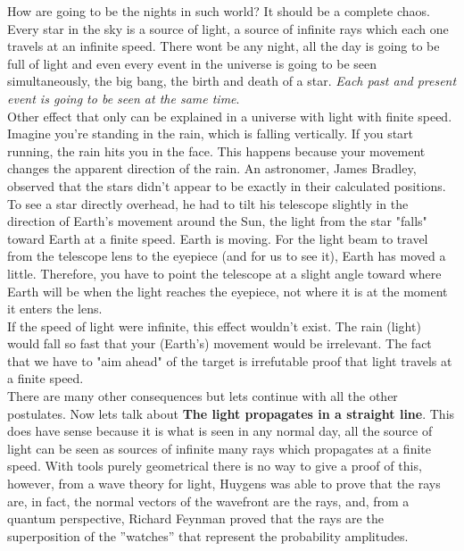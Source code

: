         How are going to be the nights in such world? It should be a complete chaos. Every star in the sky is a source of light, a source of infinite rays which each one travels at an infinite speed. There wont be any night, all the day is going to be full of light and even every event in the universe is going to be seen simultaneously, the big bang, the birth and death of a star. \textit{Each past and present event is going to be seen at the same time}.\\

        Other effect that only can be explained in a universe with light with finite speed. Imagine you're standing in the rain, which is falling vertically. If you start running, the rain hits you in the face. This happens because your movement changes the apparent direction of the rain. An astronomer, James Bradley, observed that the stars didn't appear to be exactly in their calculated positions. To see a star directly overhead, he had to tilt his telescope slightly in the direction of Earth's movement around the Sun, the light from the star "falls" toward Earth at a finite speed. Earth is moving. For the light beam to travel from the telescope lens to the eyepiece (and for us to see it), Earth has moved a little. Therefore, you have to point the telescope at a slight angle toward where Earth will be when the light reaches the eyepiece, not where it is at the moment it enters the lens.\\

        If the speed of light were infinite, this effect wouldn't exist. The rain (light) would fall so fast that your (Earth's) movement would be irrelevant. The fact that we have to "aim ahead" of the target is irrefutable proof that light travels at a finite speed. \\

        There are many other consequences but lets continue with all the other postulates. Now lets talk about \textbf{The light propagates in a straight line}. This does have sense because it is what is seen in any normal day, all the source of light can be seen as sources of infinite many rays which propagates at a finite speed. With tools purely geometrical there is no way to give a proof of this, however, from a wave theory for light, Huygens was able to prove that the rays are, in fact, the normal vectors of the wavefront are the rays, and, from a quantum perspective, Richard Feynman proved that the rays are the superposition of the ''watches'' that represent the probability amplitudes.\\

